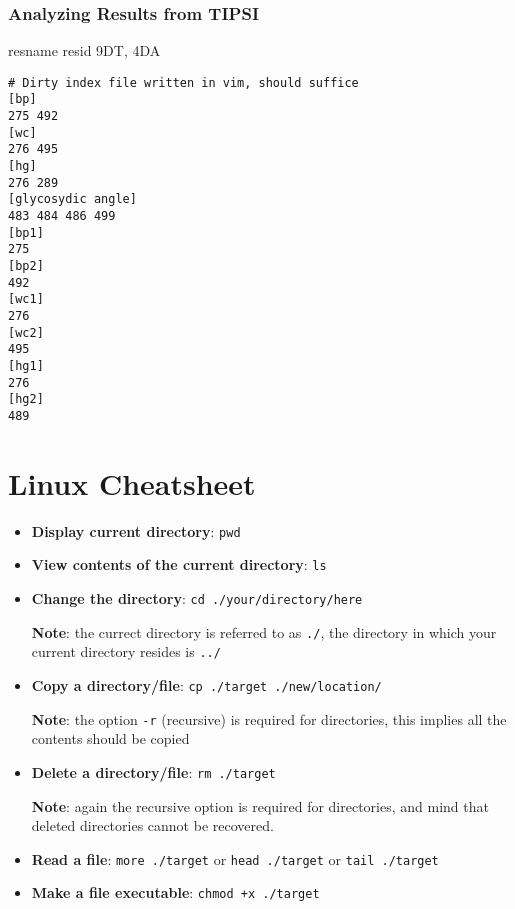 \documentclass[]{article}
\begin{document}
\subsubsection*{Analyzing Results from TIPSI}

resname resid 9DT, 4DA

\begin{lstlisting}
# Dirty index file written in vim, should suffice
[bp]
275 492
[wc]
276 495
[hg]
276 289
[glycosydic angle]
483 484 486 499
[bp1]
275
[bp2]
492
[wc1]
276
[wc2]
495
[hg1]
276
[hg2]
489
\end{lstlisting}



\newpage

\appendix
\section*{Linux Cheatsheet}
\setlength\parindent{0pt}

\begin{itemize}
\item \textbf{Display current directory}: \texttt{pwd}

\item \textbf{View contents of the current directory}: \texttt{ls}

\item \textbf{Change the directory}: \texttt{cd ./your/directory/here}

\textbf{Note}: the currect directory is referred to as \texttt{./}, the directory in which your current directory resides is \texttt{../}

\item \textbf{Copy a directory/file}: \texttt{cp ./target ./new/location/}

\textbf{Note}: the option \texttt{-r} (recursive) is required for directories, this implies all the contents should be copied

\item \textbf{Delete a directory/file}: \texttt{rm ./target}

\textbf{Note}: again the recursive option is required for directories, and mind that deleted directories cannot be recovered.

\item \textbf{Read a file}: \texttt{more ./target} or \texttt{head ./target} or \texttt{tail ./target}

\item \textbf{Make a file executable}: \texttt{chmod +x ./target}
\end{itemize}
\end{document}

